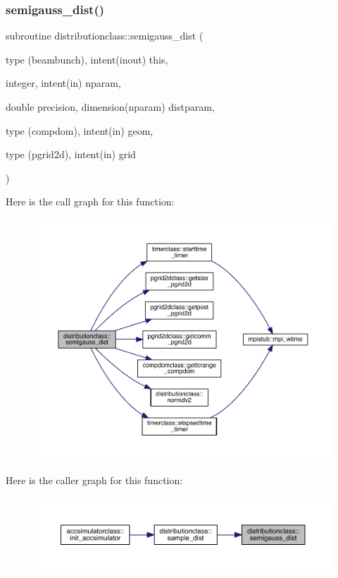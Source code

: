 \subsubsection{\texorpdfstring{semigauss\_dist()}{semigauss\_dist()}}
{\footnotesize\ttfamily subroutine distributionclass\+::semigauss\+\_\+dist (\begin{DoxyParamCaption}\item[{type (beambunch), intent(inout)}]{this,  }\item[{integer, intent(in)}]{nparam,  }\item[{double precision, dimension(nparam)}]{distparam,  }\item[{type (compdom), intent(in)}]{geom,  }\item[{type (pgrid2d), intent(in)}]{grid }\end{DoxyParamCaption})}

Here is the call graph for this function\+:\nopagebreak
\begin{figure}[H]
\begin{center}
\leavevmode
\includegraphics[width=350pt]{namespacedistributionclass_a0e031187f6b2818aebcd2911b93c0722_cgraph}
\end{center}
\end{figure}
Here is the caller graph for this function\+:\nopagebreak
\begin{figure}[H]
\begin{center}
\leavevmode
\includegraphics[width=350pt]{namespacedistributionclass_a0e031187f6b2818aebcd2911b93c0722_icgraph}
\end{center}
\end{figure}
\mbox{\label{namespacedistributionclass_a4a013e2bf1afc4cdeefe0fce7f0e0e00}} 
